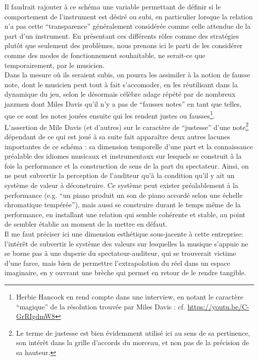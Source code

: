 \indent Il faudrait rajouter à ce schéma une variable permettant de définir si le comportement de l'instrument est désiré ou subi, en particulier lorsque la relation n'a pas cette ``transparence'' généralement considérée comme celle attendue de la part d'un instrument. En présentant ces différents rôles comme des stratégies plutôt que seulement des problèmes, nous prenons ici le parti de les considérer comme des modes de fonctionnement souhaitable, ne serait-ce que temporairement, par le musicien.\\
\indent Dans la mesure où ils seraient subis, on pourra les assimiler à la notion de fausse note, dont le musicien peut tout à fait s'accomoder, en les réutilisant dans la dynamique du jeu, selon le désormais célèbre adage répété par de nombreux jazzmen dont Miles Davis qu'il n'y a pas de ``fausses notes'' en tant que telles, que ce sont les notes jouées ensuite qui les rendent justes ou fausses\footnote{Herbie Hancock en rend compte dans une interview, en notant le caractère ``magique'' de la résolution trouvée par Miles Davis :  cf. \url{https://youtu.be/C-GrRIgdmW8}}.\\
\indent L'assertion de Mile Davis (et d'autres) sur le caractère de ``justesse'' d'une note\footnote{Le terme de justesse est bien évidemment utilisé ici au sens de sa pertinence, son intérêt dans la grille d'accords du morceau, et non pas de la précision de sa hauteur. } dépendant de ce qui est joué à sa suite fait apparaître deux autres lacunes importantes de ce schéma : sa dimension temporelle d'une part et la connaissance préalable des idiomes musicaux et instrumentaux sur lesquels se construit à la fois la performance et la construction de sens de la part du spectateur. Ainsi, on ne peut subvertir la perception de l'auditeur qu'à la condition qu'il y ait un système de valeur à déconstruire. Ce système peut exister préalablement à la performance (e.g. ``un piano produit un son de piano accordé selon une échelle chromatique tempérée''), mais aussi se construire durant le temps même de la performance, en installant une relation qui semble cohérente et stable, au point de sembler établie au moment de la mettre en défaut.\\
\indent Il me faut préciser ici une dimension esthétique sous-jacente à cette entreprise: l'intérêt de subvertir le système des valeurs sur lesquelles la musique s'appuie ne se borne pas à une duperie du spectateur-auditeur, qui se trouverait victime d'une farce, mais bien de permettre l'extrapolation du réel dans un espace imaginaire, en y ouvrant une brèche qui permet en retour de le rendre tangible.

